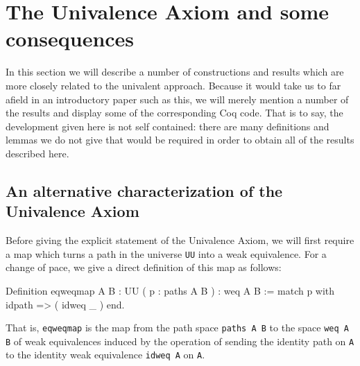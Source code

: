 \section{The Univalence Axiom and some consequences}\label{sec:hlevels}

In this section we will describe a number of constructions and results
which are more closely related to the univalent approach.  Because it
would take us to far afield in an introductory paper such as this, we
will merely mention a number of the results and display some of the
corresponding Coq code.  That is to say, the development given here is
not self contained: there are many definitions and lemmas we do not
give that would be required in order to obtain all of the results
described here.

\subsection{An alternative characterization of the Univalence Axiom}

Before giving the explicit statement of the Univalence Axiom, we will
first require a map which turns a path in the universe \verb|UU|
into a weak equivalence.  For a change of pace, we give a direct
definition of this map as follows:
\begin{center}
  \begin{coqcode}
Definition eqweqmap { A B : UU } ( p : paths A B ) : weq A B 
  := match p with idpath => ( idweq _ ) end.
  \end{coqcode}
\end{center}
That is, \verb|eqweqmap| is the map from the path space
\verb|paths A B| to the space \verb|weq A B| of weak
equivalences induced by the operation of sending the identity path on
\verb|A| to the identity weak equivalence \verb|idweq A| on 
\verb|A|.

